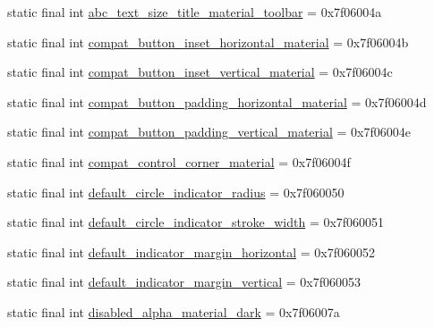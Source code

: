\begin{DoxyCompactItemize}
static final int \mbox{\hyperlink{classcom_1_1synnapps_1_1carouselview_1_1_r_1_1dimen_a1b64942b6b69ec9a315c19b855e88f7d}{abc\+\_\+text\+\_\+size\+\_\+title\+\_\+material\+\_\+toolbar}} = 0x7f06004a
\item 
static final int \mbox{\hyperlink{classcom_1_1synnapps_1_1carouselview_1_1_r_1_1dimen_ae0b1861a132d6ed5d09d66e0b4966ee1}{compat\+\_\+button\+\_\+inset\+\_\+horizontal\+\_\+material}} = 0x7f06004b
\item 
static final int \mbox{\hyperlink{classcom_1_1synnapps_1_1carouselview_1_1_r_1_1dimen_a383784a55c6d41152064ed00a0da38c3}{compat\+\_\+button\+\_\+inset\+\_\+vertical\+\_\+material}} = 0x7f06004c
\item 
static final int \mbox{\hyperlink{classcom_1_1synnapps_1_1carouselview_1_1_r_1_1dimen_a7b7ded6a110ea027066f9ea6cc04d28b}{compat\+\_\+button\+\_\+padding\+\_\+horizontal\+\_\+material}} = 0x7f06004d
\item 
static final int \mbox{\hyperlink{classcom_1_1synnapps_1_1carouselview_1_1_r_1_1dimen_a09ee9648c7d785e3609295b3c6be6863}{compat\+\_\+button\+\_\+padding\+\_\+vertical\+\_\+material}} = 0x7f06004e
\item 
static final int \mbox{\hyperlink{classcom_1_1synnapps_1_1carouselview_1_1_r_1_1dimen_ad68fc6ed206ea443f97d625defae0d2b}{compat\+\_\+control\+\_\+corner\+\_\+material}} = 0x7f06004f
\item 
static final int \mbox{\hyperlink{classcom_1_1synnapps_1_1carouselview_1_1_r_1_1dimen_a9b35c62d83e29263686474e8e87bf2b0}{default\+\_\+circle\+\_\+indicator\+\_\+radius}} = 0x7f060050
\item 
static final int \mbox{\hyperlink{classcom_1_1synnapps_1_1carouselview_1_1_r_1_1dimen_adb922933df9122a3158eb14bb3651a59}{default\+\_\+circle\+\_\+indicator\+\_\+stroke\+\_\+width}} = 0x7f060051
\item 
static final int \mbox{\hyperlink{classcom_1_1synnapps_1_1carouselview_1_1_r_1_1dimen_a257fffc6f2e29f2540e41457f57589c5}{default\+\_\+indicator\+\_\+margin\+\_\+horizontal}} = 0x7f060052
\item 
static final int \mbox{\hyperlink{classcom_1_1synnapps_1_1carouselview_1_1_r_1_1dimen_a22d5dcd9d24f27dd05e279e331d7cb1f}{default\+\_\+indicator\+\_\+margin\+\_\+vertical}} = 0x7f060053
\item 
static final int \mbox{\hyperlink{classcom_1_1synnapps_1_1carouselview_1_1_r_1_1dimen_a19bea5ea62a8930f8fcb730607a5d0ea}{disabled\+\_\+alpha\+\_\+material\+\_\+dark}} = 0x7f06007a
\item 

\end{DoxyCompactItemize}
